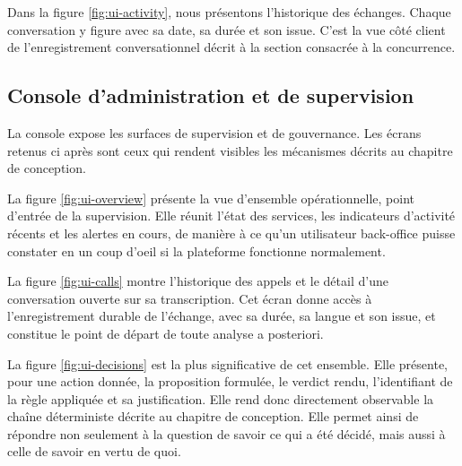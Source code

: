 
Dans la figure \ref{fig:ui-activity}, nous présentons l'historique des échanges. Chaque conversation y figure avec sa date, sa durée et son issue. C'est la vue côté client de l'enregistrement conversationnel décrit à la section consacrée à la concurrence.


\subsection{Console d'administration et de supervision}

La console expose les surfaces de supervision et de gouvernance. Les écrans retenus ci après sont ceux qui rendent visibles les mécanismes décrits au chapitre de conception.

La figure \ref{fig:ui-overview} présente la vue d'ensemble opérationnelle, point d'entrée de la supervision. Elle réunit l'état des services, les indicateurs d'activité récents et les alertes en cours, de manière à ce qu'un utilisateur back-office puisse constater en un coup d'oeil si la plateforme fonctionne normalement.


La figure \ref{fig:ui-calls} montre l'historique des appels et le détail d'une conversation ouverte sur sa transcription. Cet écran donne accès à l'enregistrement durable de l'échange, avec sa durée, sa langue et son issue, et constitue le point de départ de toute analyse a posteriori.


La figure \ref{fig:ui-decisions} est la plus significative de cet ensemble. Elle présente, pour une action donnée, la proposition formulée, le verdict rendu, l'identifiant de la règle appliquée et sa justification. Elle rend donc directement observable la chaîne déterministe décrite au chapitre de conception. Elle permet ainsi de répondre non seulement à la question de savoir ce qui a été décidé, mais aussi à celle de savoir en vertu de quoi.

